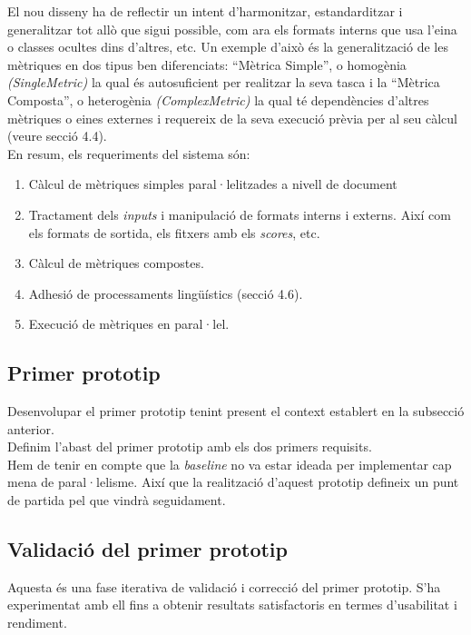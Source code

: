 \documentclass[11pt,a4paper]{article}
\begin{document}
El nou disseny ha de reflectir un intent d'harmonitzar, estandarditzar i generalitzar tot allò que sigui possible, com ara els formats interns que usa l'eina o classes ocultes dins d'altres, etc. Un exemple d'això és la generalització de les mètriques en dos tipus ben diferenciats: ``Mètrica Simple'', o homogènia \textit{(SingleMetric)} la qual és autosuficient per realitzar la seva tasca i la ``Mètrica Composta'', o heterogènia \textit{(ComplexMetric)} la qual té dependències d'altres mètriques o eines externes i requereix de la seva execució prèvia per al seu càlcul (veure secció 4.4).
\\

En resum, els requeriments del sistema són:

\begin{enumerate}
\item Càlcul de mètriques simples paral·lelitzades a nivell de document

\item Tractament dels \textit{inputs} i manipulació de formats interns i externs. Així com els formats de sortida, els fitxers amb els \emph{scores}, etc.

\item Càlcul de mètriques compostes.

\item Adhesió de processaments lingüístics (secció 4.6).

\item Execució de mètriques en paral·lel.
\end{enumerate}
\subsection{Primer prototip}
Desenvolupar el primer prototip tenint present el context establert en la subsecció anterior. 
\\

Definim l'abast del primer prototip amb els dos primers requisits.
\\

Hem de tenir en compte que la \emph{baseline} no va estar ideada per implementar cap mena de paral·lelisme. Així que la realització d'aquest prototip defineix un punt de partida pel que vindrà seguidament.

\subsection{Validació del primer prototip}
Aquesta és una fase iterativa de validació i correcció del primer prototip. S'ha experimentat amb  ell fins a obtenir resultats satisfactoris en termes d'usabilitat i rendiment.
\\
\end{document}
